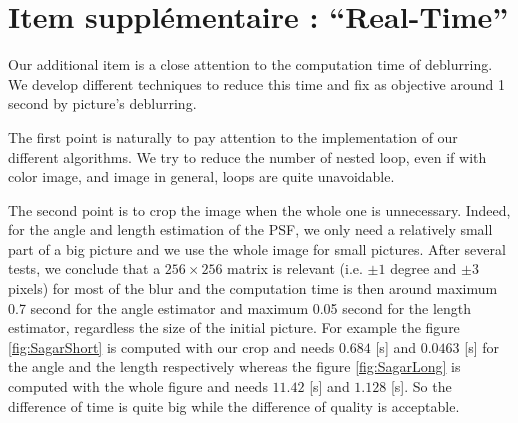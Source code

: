 \section{Item supplémentaire : ``Real-Time''}

Our additional item is a close attention to the computation time of deblurring. 
We develop different techniques to reduce this time and fix as objective around 1 second by picture's deblurring.  

The first point is naturally to pay attention to the implementation of our different algorithms. We try to reduce the number of nested loop, even if with color image, and image in general, loops are quite unavoidable. 

The second point is to crop the image when the whole one is unnecessary. Indeed, for the angle and length estimation of the PSF, we only need a relatively small part of a big picture and we  use the whole image for small pictures. After several tests, we conclude that a $256 \times 256 $ matrix is relevant (i.e. $\pm 1$ degree and $\pm 3$ pixels) for most of the blur and the computation time is then around maximum 0.7 second for the angle estimator and maximum 0.05 second for the length estimator, regardless the size of the initial picture. For example the figure \ref{fig:SagarShort} is computed with our crop and needs $0.684 $ [s] and $0.0463$ [s] for the angle and the length respectively whereas the figure \ref{fig:SagarLong} is computed with the whole figure and needs $11.42$ [s] and $1.128$ [s]. So the difference of time is quite big while the difference of quality is acceptable. 
